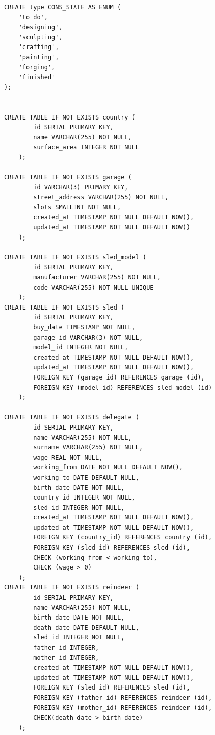 \documentclass[12pt]{report}
\begin{document}
\begin{lstlisting}
CREATE type CONS_STATE AS ENUM (
    'to do',
    'designing',
    'sculpting',
    'crafting',
    'painting',
    'forging',
    'finished'
);


CREATE TABLE IF NOT EXISTS country (
        id SERIAL PRIMARY KEY,
        name VARCHAR(255) NOT NULL,
        surface_area INTEGER NOT NULL
    );

CREATE TABLE IF NOT EXISTS garage (
        id VARCHAR(3) PRIMARY KEY,
        street_address VARCHAR(255) NOT NULL,
        slots SMALLINT NOT NULL,
        created_at TIMESTAMP NOT NULL DEFAULT NOW(),
        updated_at TIMESTAMP NOT NULL DEFAULT NOW()
    );

CREATE TABLE IF NOT EXISTS sled_model (
        id SERIAL PRIMARY KEY,
        manufacturer VARCHAR(255) NOT NULL,
        code VARCHAR(255) NOT NULL UNIQUE
    );
CREATE TABLE IF NOT EXISTS sled (
        id SERIAL PRIMARY KEY,
        buy_date TIMESTAMP NOT NULL,
        garage_id VARCHAR(3) NOT NULL,
        model_id INTEGER NOT NULL,
        created_at TIMESTAMP NOT NULL DEFAULT NOW(),
        updated_at TIMESTAMP NOT NULL DEFAULT NOW(),
        FOREIGN KEY (garage_id) REFERENCES garage (id),
        FOREIGN KEY (model_id) REFERENCES sled_model (id)
    );

CREATE TABLE IF NOT EXISTS delegate (
        id SERIAL PRIMARY KEY,
        name VARCHAR(255) NOT NULL,
        surname VARCHAR(255) NOT NULL,
        wage REAL NOT NULL,
        working_from DATE NOT NULL DEFAULT NOW(),
        working_to DATE DEFAULT NULL,
        birth_date DATE NOT NULL,
        country_id INTEGER NOT NULL,
        sled_id INTEGER NOT NULL,
        created_at TIMESTAMP NOT NULL DEFAULT NOW(),
        updated_at TIMESTAMP NOT NULL DEFAULT NOW(),
        FOREIGN KEY (country_id) REFERENCES country (id),
        FOREIGN KEY (sled_id) REFERENCES sled (id),
        CHECK (working_from < working_to),
        CHECK (wage > 0)
    );
CREATE TABLE IF NOT EXISTS reindeer (
        id SERIAL PRIMARY KEY,
        name VARCHAR(255) NOT NULL,
        birth_date DATE NOT NULL,
        death_date DATE DEFAULT NULL,
        sled_id INTEGER NOT NULL,
        father_id INTEGER,
        mother_id INTEGER,
        created_at TIMESTAMP NOT NULL DEFAULT NOW(),
        updated_at TIMESTAMP NOT NULL DEFAULT NOW(),
        FOREIGN KEY (sled_id) REFERENCES sled (id),
        FOREIGN KEY (father_id) REFERENCES reindeer (id),
        FOREIGN KEY (mother_id) REFERENCES reindeer (id),
        CHECK(death_date > birth_date)
    );


\end{lstlisting}
\end{document}
